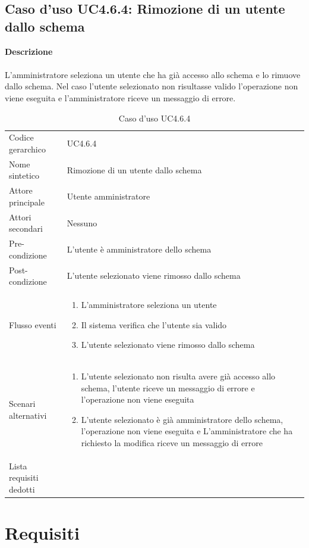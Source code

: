 \documentclass[a4paper]{report}
\newcommand{\mychapter}[2]{
	\setcounter{chapter}{#1}
	\setcounter{section}{0}
	\setcounter{subsection}{1}
	\chapter*{#2}
	\addcontentsline{toc}{chapter}{#2}
}
\begin{document}
	 \section{Caso d'uso UC4.6.4: Rimozione di un utente dallo schema}
	 \textbf{Descrizione} \\ \\
	 L'amministratore seleziona un utente che ha già accesso allo schema e lo rimuove dallo schema. 
	 Nel caso l'utente selezionato non risultasse valido l'operazione non viene eseguita e l'amministratore
	  riceve un messaggio di errore.
		\begin{table}[H]
		\begin{tabularx}{\textwidth}{X | X}\toprule
			\rowcolor{orange!65}Codice gerarchico & UC4.6.4 \\
			Nome sintetico & Rimozione di un utente dallo schema \\
			\rowcolor{orange!65}Attore principale & Utente amministratore\\
			Attori secondari & Nessuno \\
			\rowcolor{orange!65}Pre-condizione & L'utente è amministratore dello schema \\
			Post-condizione & L'utente selezionato viene rimosso dallo schema\\
			\rowcolor{orange!65}Flusso eventi & \begin{enumerate}
			\item L'amministratore seleziona un utente
			\item Il sistema verifica che l'utente sia valido
			\item L'utente selezionato viene rimosso dallo schema
			\end{enumerate} \\
			Scenari alternativi & \begin{enumerate}
			\item L'utente selezionato non risulta avere già accesso allo schema, l'utente riceve un messaggio
			 di errore e l'operazione non viene eseguita
			 \item L'utente selezionato è già amministratore dello schema, l'operazione non viene eseguita e
			 L'amministratore che ha richiesto la modifica riceve un messaggio di errore
			\end{enumerate} \\
			\rowcolor{orange!65}Lista requisiti dedotti & \\
			\bottomrule
		\end{tabularx}
		\caption{Caso d'uso UC4.6.4}
	 \end{table}
	\mychapter{4}{Requisiti}
	\cleardoublepage
	\listoffigures
	
	\cleardoublepage
	\listoftables
		
\end{document}
